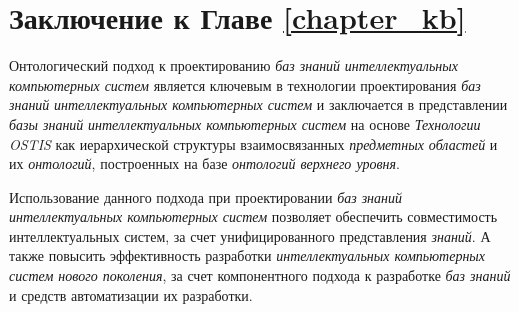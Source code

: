 \section*{Заключение к Главе \ref{chapter_kb}}

Онтологический подход к проектированию \textit{баз знаний} \textit{интеллектуальных компьютерных систем} является ключевым в технологии проектирования \textit{баз знаний} \textit{интеллектуальных компьютерных систем} и заключается в представлении \textit{базы знаний} \textit{интеллектуальных компьютерных систем} на основе \textit{Технологии OSTIS} как иерархической структуры взаимосвязанных \textit{предметных областей} и их \textit{онтологий}, построенных на базе \textit{онтологий верхнего уровня}.

Использование данного подхода при проектировании \textit{баз знаний} \textit{интеллектуальных компьютерных систем} позволяет обеспечить совместимость интеллектуальных систем, за счет унифицированного представления \textit{знаний}. А также повысить эффективность разработки \textit{интеллектуальных компьютерных систем нового поколения}, за счет компонентного подхода к разработке \textit{баз знаний} и средств автоматизации их разработки.

%